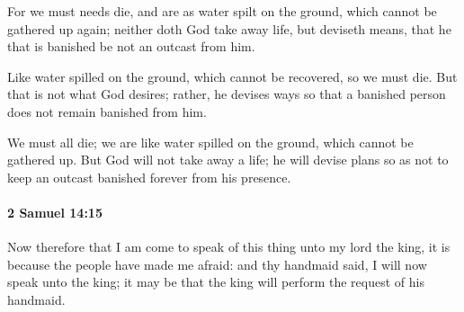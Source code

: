 			\begin{versebox}
					\item[BHS] 
					\item[ASV] For we must needs die, and are as water spilt on the ground, which cannot be gathered up again; neither doth God take away life, but deviseth means, that he that is banished be not an outcast from him.
					\item[NIV] Like water spilled on the ground, which cannot be recovered, so we must die. But that is not what God desires; rather, he devises ways so that a banished person does not remain banished from him.
					\item[NRSV] We must all die; we are like water spilled on the ground, which cannot be gathered up. But God will not take away a life; he will devise plans so as not to keep an outcast banished forever from his presence.
			\end{versebox}

		\paragraph{2 Samuel 14:15} %
			\label{2SAMUEL-14-15}

			Now therefore that I am come to speak of this thing unto my lord the king, it is because the people have made me afraid: and thy handmaid said, I will now speak unto the king; it may be that the king will perform the request of his handmaid.

